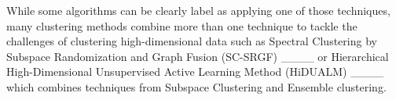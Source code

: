 While some algorithms can be clearly label as applying one of those techniques, many clustering methods combine more than one technique to tackle the challenges of clustering high-dimensional data such as Spectral Clustering by Subspace Randomization and Graph Fusion (SC-SRGF) ____ or Hierarchical High-Dimensional Unsupervised Active Learning Method (HiDUALM) ____ which combines techniques from Subspace Clustering and Ensemble clustering. 




